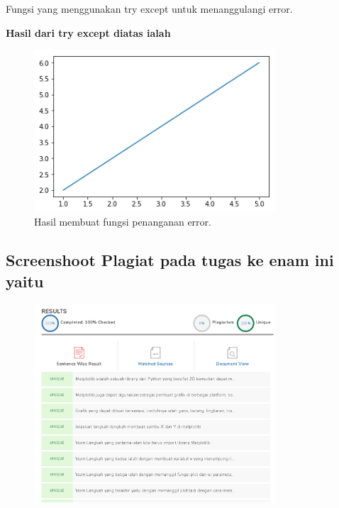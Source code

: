 \hfill \break
Fungsi yang menggunakan try except untuk menanggulangi error.



\hfill \break
\textbf{Hasil dari try except diatas ialah}

\begin{figure}[H]
	\includegraphics[width=9cm]{figures/6/1174021/p5.png}
	\centering
	\caption{Hasil membuat fungsi penanganan error.}
\end{figure}

\subsection{Screenshoot Plagiat pada tugas ke enam ini yaitu}
\begin{figure}[H]
	\includegraphics[width=9cm]{figures/6/1174021/plagiat.png}
	\centering
\end{figure}